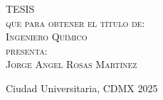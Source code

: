 \begin{titlepage}
\begin{minipage}[c][0.81\textheight][t]{0.75\textwidth}
\begin{center}
            \textsc{\LARGE T\hspace{1.5cm}E\hspace{1.5cm}S\hspace{1.5cm}I\hspace{1.5cm}S}\\[0.5cm]
            \textsc{\large que para obtener el t\'itulo de:}\\[0.5cm]
            \textsc{\large Ingeniero Químico}\\[0.5cm]
            \textsc{\large presenta:}\\[0.5cm]
            \textsc{\large {Jorge Angel Rosas Martínez}}\\[2cm]          

            \vspace{0.5cm}


            \vspace{0.5cm}

            \large{Ciudad Universitaria, CDMX}{ }{2025}
        \end{center}
    \end{minipage}
\end{titlepage}
